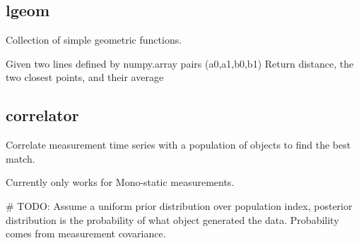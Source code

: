 \documentclass[letterpaper,10pt,english]{sphinxmanual}
\begin{document}
\subsection{lgeom}
\label{\detokenize{modules/lgeom:module-lgeom}}\label{\detokenize{modules/lgeom:lgeom}}\label{\detokenize{modules/lgeom::doc}}
Collection of simple geometric functions.

\begin{fulllineitems}
\label{\detokenize{modules/lgeom:lgeom.dist}}
Given two lines defined by numpy.array pairs (a0,a1,b0,b1)
Return distance, the two closest points, and their average

\end{fulllineitems}



\subsection{correlator}
\label{\detokenize{modules/correlator:module-correlator}}\label{\detokenize{modules/correlator:correlator}}\label{\detokenize{modules/correlator::doc}}
Correlate measurement time series with a population of objects to find the best match.

Currently only works for Mono-static measurements.

\# TODO: Assume a uniform prior distribution over population index, posterior distribution is the probability of what object generated the data. Probability comes from measurement covariance.
\end{document}
